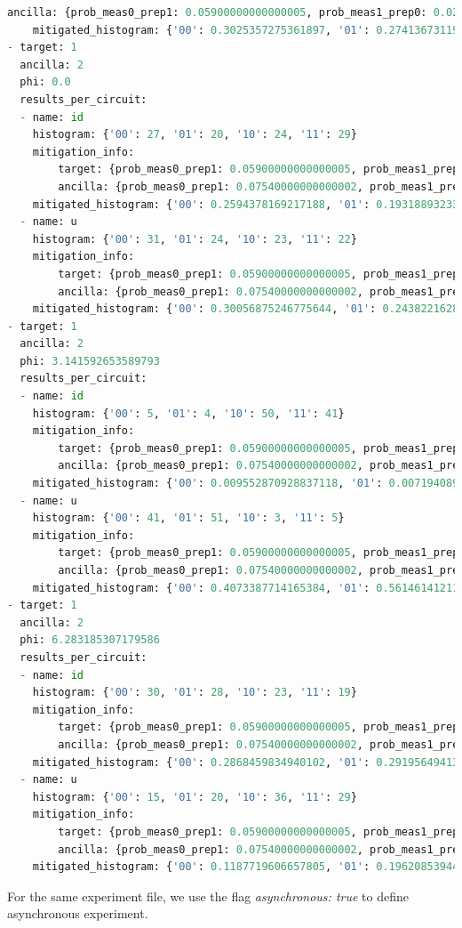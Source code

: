\documentclass[preprint,12pt, a4paper, dvipsnames]{elsarticle}
\newcommand{\1}{{\rm 1\hspace{-0.9mm}l}}
\theoremstyle{definition}
\begin{document}
\begin{lstlisting}[language=Python, caption=Results (synchronous)]
		ancilla: {prob_meas0_prep1: 0.05900000000000005, prob_meas1_prep0: 0.0202}
	mitigated_histogram: {'00': 0.3025357275361897, '01': 0.27413673119534815, '10': 0.24313373302688793, '11': 0.18019380824157433}
- target: 1
  ancilla: 2
  phi: 0.0
  results_per_circuit:
  - name: id
	histogram: {'00': 27, '01': 20, '10': 24, '11': 29}
	mitigation_info:
		target: {prob_meas0_prep1: 0.05900000000000005, prob_meas1_prep0: 0.0202}
		ancilla: {prob_meas0_prep1: 0.07540000000000002, prob_meas1_prep0: 0.0528}
	mitigated_histogram: {'00': 0.2594378169217188, '01': 0.19318893233269735, '10': 0.23035366874292057, '11': 0.3170195820026633}
  - name: u
	histogram: {'00': 31, '01': 24, '10': 23, '11': 22}
	mitigation_info:
		target: {prob_meas0_prep1: 0.05900000000000005, prob_meas1_prep0: 0.0202}
		ancilla: {prob_meas0_prep1: 0.07540000000000002, prob_meas1_prep0: 0.0528}
	mitigated_histogram: {'00': 0.30056875246775644, '01': 0.2438221628798003, '10': 0.22180309809696985, '11': 0.23380598655547338}
- target: 1
  ancilla: 2
  phi: 3.141592653589793
  results_per_circuit:
  - name: id
	histogram: {'00': 5, '01': 4, '10': 50, '11': 41}
	mitigation_info:
		target: {prob_meas0_prep1: 0.05900000000000005, prob_meas1_prep0: 0.0202}
		ancilla: {prob_meas0_prep1: 0.07540000000000002, prob_meas1_prep0: 0.0528}
	mitigated_histogram: {'00': 0.009552870928837118, '01': 0.007194089383161034, '10': 0.5236791012692514, '11': 0.4595739384187503}
  - name: u
	histogram: {'00': 41, '01': 51, '10': 3, '11': 5}
	mitigation_info:
		target: {prob_meas0_prep1: 0.05900000000000005, prob_meas1_prep0: 0.0202}
		ancilla: {prob_meas0_prep1: 0.07540000000000002, prob_meas1_prep0: 0.0528}
	mitigated_histogram: {'00': 0.4073387714165384, '01': 0.5614614121117936, '10': 0.006431862814564833, '11': 0.024767953657102992}
- target: 1
  ancilla: 2
  phi: 6.283185307179586
  results_per_circuit:
  - name: id
	histogram: {'00': 30, '01': 28, '10': 23, '11': 19}
	mitigation_info:
		target: {prob_meas0_prep1: 0.05900000000000005, prob_meas1_prep0: 0.0202}
		ancilla: {prob_meas0_prep1: 0.07540000000000002, prob_meas1_prep0: 0.0528}
	mitigated_histogram: {'00': 0.2868459834940102, '01': 0.2919564941384742, '10': 0.22466574543735374, '11': 0.19653177693016174}
  - name: u
	histogram: {'00': 15, '01': 20, '10': 36, '11': 29}
	mitigation_info:
		target: {prob_meas0_prep1: 0.05900000000000005, prob_meas1_prep0: 0.0202}
		ancilla: {prob_meas0_prep1: 0.07540000000000002, prob_meas1_prep0: 0.0528}
	mitigated_histogram: {'00': 0.1187719606657805, '01': 0.1962085394489247, '10': 0.3710195249988589, '11': 0.31399997488643583}
\end{lstlisting}
For the same experiment file, we use the flag \textit{asynchronous: true} to define asynchronous experiment.
\end{document}
